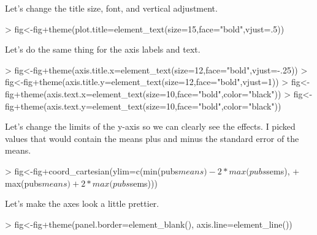 \documentclass[12pt]{article}
\begin{document}
Let's change the title size, font, and vertical adjustment.
\begin{Schunk}
\begin{Sinput}
> fig<-fig+theme(plot.title=element_text(size=15,face="bold",vjust=.5))
\end{Sinput}
\end{Schunk}

Let's do the same thing for the axis labels and text.
\begin{Schunk}
\begin{Sinput}
> fig<-fig+theme(axis.title.x=element_text(size=12,face="bold",vjust=-.25))
> fig<-fig+theme(axis.title.y=element_text(size=12,face="bold",vjust=1))
> fig<-fig+theme(axis.text.x=element_text(size=10,face="bold",color="black"))
> fig<-fig+theme(axis.text.y=element_text(size=10,face="bold",color="black"))
\end{Sinput}
\end{Schunk}

Let's change the limits of the y-axis so we can clearly see the effects. I picked
values that would contain the means plus and minus the standard error of the means.
\begin{Schunk}
\begin{Sinput}
> fig<-fig+coord_cartesian(ylim=c(min(pubs$means)-2*max(pubs$sems),
+                                 max(pubs$means)+2*max(pubs$sems)))
\end{Sinput}
\end{Schunk}

Let's make the axes look a little prettier.
\begin{Schunk}
\begin{Sinput}
> fig<-fig+theme(panel.border=element_blank(), axis.line=element_line())
\end{Sinput}
\end{Schunk}
\end{document}
